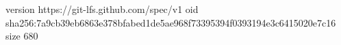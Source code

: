 version https://git-lfs.github.com/spec/v1
oid sha256:7a9cb39eb6863e378bfabed1de5ae968f73395394f0393194e3c6415020e7c16
size 680
